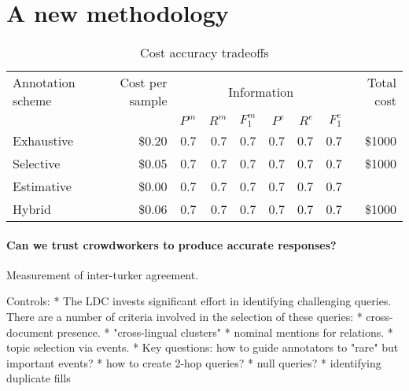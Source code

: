 \section{A new methodology}

\begin{table*}
  \begin{tabular}{l r r r r r r r r} \toprule
    Annotation scheme & Cost per sample & \multicolumn{6}{c}{Information} & Total cost \\ 
                      &                      & $P^m$ & $R^m$ & $F_1^m$ & $P^e$ & $R^e$ & $F_1^e$ &  \\ \midrule
    Exhaustive & \$0.20 & 0.7 & 0.7 & 0.7 & 0.7 & 0.7 & 0.7 & \$1000 \\
    Selective  & \$0.05 & 0.7 & 0.7 & 0.7 & 0.7 & 0.7 & 0.7 & \$1000 \\
    Estimative & \$0.00 & 0.7 & 0.7 & 0.7 & 0.7 & 0.7 & 0.7 &  \\
    Hybrid     & \$0.06 & 0.7 & 0.7 & 0.7 & 0.7 & 0.7 & 0.7 & \$1000 \\ \bottomrule
  \end{tabular}
  \caption{Cost accuracy tradeoffs}
\end{table*}

\paragraph{Can we trust crowdworkers to produce accurate responses?}

Measurement of inter-turker agreement.

Controls:
* The LDC invests significant effort in identifying challenging queries. There are a number of criteria involved in the selection of these queries:
  * cross-document presence.
  * "cross-lingual clusters"
  * nominal mentions for relations.
  * topic selection via events.
* Key questions: how to guide annotators to "rare" but important events?
  * how to create 2-hop queries?
  * null queries?
  * identifying duplicate fills

